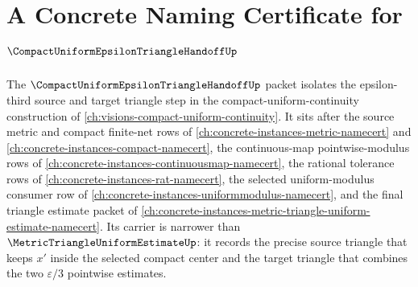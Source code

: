 \chapter{A Concrete Naming Certificate for $\CompactUniformEpsilonTriangleHandoffUp$}
\label{ch:concrete-instances-compact-uniform-epsilon-triangle-handoff-namecert}

The $\CompactUniformEpsilonTriangleHandoffUp$ packet isolates the epsilon-third source and target triangle step in the compact-uniform-continuity construction of \autoref{ch:visions-compact-uniform-continuity}. It sits after the source metric and compact finite-net rows of \autoref{ch:concrete-instances-metric-namecert} and \autoref{ch:concrete-instances-compact-namecert}, the continuous-map pointwise-modulus rows of \autoref{ch:concrete-instances-continuousmap-namecert}, the rational tolerance rows of \autoref{ch:concrete-instances-rat-namecert}, the selected uniform-modulus consumer row of \autoref{ch:concrete-instances-uniformmodulus-namecert}, and the final triangle estimate packet of \autoref{ch:concrete-instances-metric-triangle-uniform-estimate-namecert}. Its carrier is narrower than $\MetricTriangleUniformEstimateUp$: it records the precise source triangle that keeps $x'$ inside the selected compact center and the target triangle that combines the two $\varepsilon/3$ pointwise estimates.

